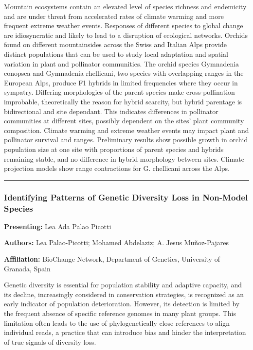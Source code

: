 \documentclass[
  letterpaper,
  DIV=11,
  numbers=noendperiod]{scrartcl}
\begin{document}
Mountain ecosystems contain an elevated level of species richness and
endemicity and are under threat from accelerated rates of climate
warming and more frequent extreme weather events. Responses of different
species to global change are idiosyncratic and likely to lead to a
disruption of ecological networks. Orchids found on different
mountainsides across the Swiss and Italian Alps provide distinct
populations that can be used to study local adaptation and spatial
variation in plant and pollinator communities. The orchid species
Gymnadenia conopsea and Gymnadenia rhellicani, two species with
overlapping ranges in the European Alps, produce F1 hybrids in limited
frequencies where they occur in sympatry. Differing morphologies of the
parent species make cross-pollination improbable, theoretically the
reason for hybrid scarcity, but hybrid parentage is bidirectional and
site dependant. This indicates differences in pollinator communities at
different sites, possibly dependent on the sites' plant community
composition. Climate warming and extreme weather events may impact plant
and pollinator survival and ranges. Preliminary results show possible
growth in orchid population size at one site with proportions of parent
species and hybrids remaining stable, and no difference in hybrid
morphology between sites. Climate projection models show range
contractions for G. rhellicani across the Alps.

\begin{center}\rule{0.5\linewidth}{0.5pt}\end{center}

\subsubsection{Identifying Patterns of Genetic Diversity Loss in
Non-Model
Species}\label{identifying-patterns-of-genetic-diversity-loss-in-non-model-species}

\textbf{Presenting:} Lea Ada Palao Picotti

\textbf{Authors:} Lea Palao-Picotti; Mohamed Abdelaziz; A. Jesus
Muñoz-Pajares

\textbf{Affiliation:} BioChange Network, Department of Genetics,
University of Granada, Spain

Genetic diversity is essential for population stability and adaptive
capacity, and its decline, increasingly considered in conservation
strategies, is recognized as an early indicator of population
deterioration. However, its detection is limited by the frequent absence
of specific reference genomes in many plant groups. This limitation
often leads to the use of phylogenetically close references to align
individual reads, a practice that can introduce bias and hinder the
interpretation of true signals of diversity loss.
\end{document}
